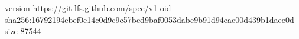 version https://git-lfs.github.com/spec/v1
oid sha256:16792194ebef0e14c0d9c9c57bcd9baf0053dabe9b91d94eac00d439b1daee0d
size 87544
